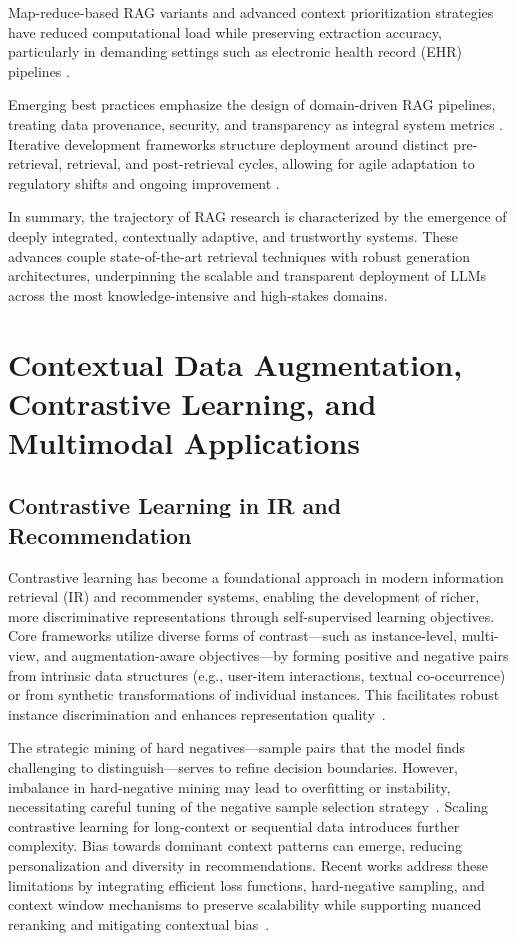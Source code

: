 \documentclass[sigconf]{acmart}
\begin{document}
Map-reduce-based RAG variants and advanced context prioritization strategies have reduced computational load while preserving extraction accuracy, particularly in demanding settings such as electronic health record (EHR) pipelines \cite{ref5, ref52, ref55}.

Emerging best practices emphasize the design of domain-driven RAG pipelines, treating data provenance, security, and transparency as integral system metrics \cite{ref63, ref64}. Iterative development frameworks structure deployment around distinct pre-retrieval, retrieval, and post-retrieval cycles, allowing for agile adaptation to regulatory shifts and ongoing improvement \cite{ref5, ref63}.

In summary, the trajectory of RAG research is characterized by the emergence of deeply integrated, contextually adaptive, and trustworthy systems. These advances couple state-of-the-art retrieval techniques with robust generation architectures, underpinning the scalable and transparent deployment of LLMs across the most knowledge-intensive and high-stakes domains.

\section{Contextual Data Augmentation, Contrastive Learning, and Multimodal Applications}

\subsection{Contrastive Learning in IR and Recommendation}

Contrastive learning has become a foundational approach in modern information retrieval (IR) and recommender systems, enabling the development of richer, more discriminative representations through self-supervised learning objectives. Core frameworks utilize diverse forms of contrast—such as instance-level, multi-view, and augmentation-aware objectives—by forming positive and negative pairs from intrinsic data structures (e.g., user-item interactions, textual co-occurrence) or from synthetic transformations of individual instances. This facilitates robust instance discrimination and enhances representation quality~\cite{ref12,ref14,ref15,ref16,ref18,ref19,ref20,ref21,ref23,ref24,ref25,ref26,ref27,ref30,ref32,ref33,ref36,ref37,ref38,ref43,ref45,ref54,ref55,ref62}. 

The strategic mining of hard negatives—sample pairs that the model finds challenging to distinguish—serves to refine decision boundaries. However, imbalance in hard-negative mining may lead to overfitting or instability, necessitating careful tuning of the negative sample selection strategy~\cite{ref14,ref16,ref37}. Scaling contrastive learning for long-context or sequential data introduces further complexity. Bias towards dominant context patterns can emerge, reducing personalization and diversity in recommendations. Recent works address these limitations by integrating efficient loss functions, hard-negative sampling, and context window mechanisms to preserve scalability while supporting nuanced reranking and mitigating contextual bias~\cite{ref14,ref15,ref16,ref32,ref33,ref36,ref37,ref43,ref54,ref55}.
\end{document}

